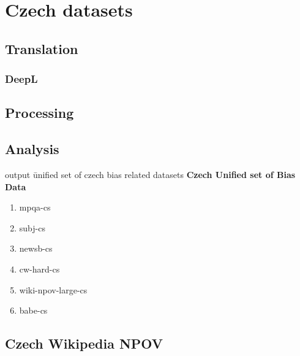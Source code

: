 \chapter{Czech datasets}
\section{Translation}
\subsection{DeepL}
\section{Processing}
\section{Analysis}
output \= unified set of czech bias related datasets
\textbf{Czech Unified set of Bias Data}
\begin{enumerate}
    \item mpqa-cs
    \item subj-cs
    \item newsb-cs
    \item cw-hard-cs
    \item wiki-npov-large-cs
    \item babe-cs
\end{enumerate}

\section{Czech Wikipedia NPOV}